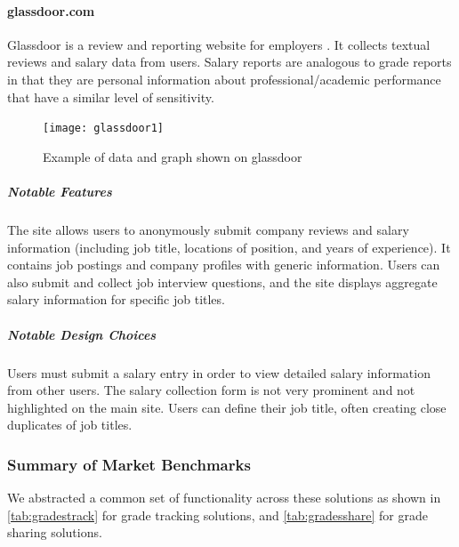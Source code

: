 \paragraph{glassdoor.com}

Glassdoor is a review and reporting website for employers \cite{glassdoor}. It collects textual reviews and salary data from users. Salary reports are analogous to grade reports in that they are personal information about professional/academic performance that have a similar level of sensitivity.

\begin{figure}[H]
\noindent \texttt{[image: glassdoor1]}
\centering
\caption{Example of data and graph shown on glassdoor}
\label{fig:glassdoor-data}
\end{figure}

\subparagraph{Notable Features}
The site allows users to anonymously submit company reviews and salary information (including job title, locations of position, and years of experience). It contains job postings and company profiles with generic information. Users can also submit and collect job interview questions, and the site displays aggregate salary information for specific job titles.

\subparagraph{Notable Design Choices}

Users must submit a salary entry in order to view detailed salary information from other users. The salary collection form is not very prominent and not highlighted on the main site. Users can define their job title, often creating close duplicates of job titles.

\subsubsection{Summary of Market Benchmarks}
We abstracted a common set of functionality across these solutions as shown in \cref{tab:gradestrack} for grade tracking solutions, and \cref{tab:gradesshare} for grade sharing solutions.

